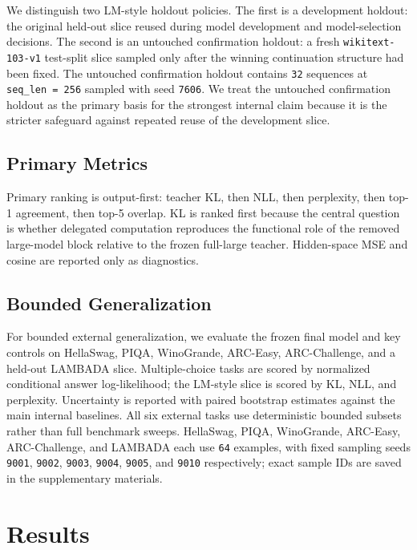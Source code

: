 \documentclass[11pt]{article}
\begin{document}
We distinguish two LM-style holdout policies. The first is a development holdout: the original held-out slice reused during model development and model-selection decisions. The second is an untouched confirmation holdout: a fresh \texttt{wikitext-103-v1} test-split slice sampled only after the winning continuation structure had been fixed. The untouched confirmation holdout contains \texttt{32} sequences at \texttt{seq\_len = 256} sampled with seed \texttt{7606}. We treat the untouched confirmation holdout as the primary basis for the strongest internal claim because it is the stricter safeguard against repeated reuse of the development slice.

\subsection{Primary Metrics}

Primary ranking is output-first: teacher KL, then NLL, then perplexity, then top-1 agreement, then top-5 overlap. KL is ranked first because the central question is whether delegated computation reproduces the functional role of the removed large-model block relative to the frozen full-large teacher. Hidden-space MSE and cosine are reported only as diagnostics.

\subsection{Bounded Generalization}

For bounded external generalization, we evaluate the frozen final model and key controls on HellaSwag, PIQA, WinoGrande, ARC-Easy, ARC-Challenge, and a held-out LAMBADA slice. Multiple-choice tasks are scored by normalized conditional answer log-likelihood; the LM-style slice is scored by KL, NLL, and perplexity. Uncertainty is reported with paired bootstrap estimates against the main internal baselines. All six external tasks use deterministic bounded subsets rather than full benchmark sweeps. HellaSwag, PIQA, WinoGrande, ARC-Easy, ARC-Challenge, and LAMBADA each use \texttt{64} examples, with fixed sampling seeds \texttt{9001}, \texttt{9002}, \texttt{9003}, \texttt{9004}, \texttt{9005}, and \texttt{9010} respectively; exact sample IDs are saved in the supplementary materials.

\section{Results}
\end{document}
